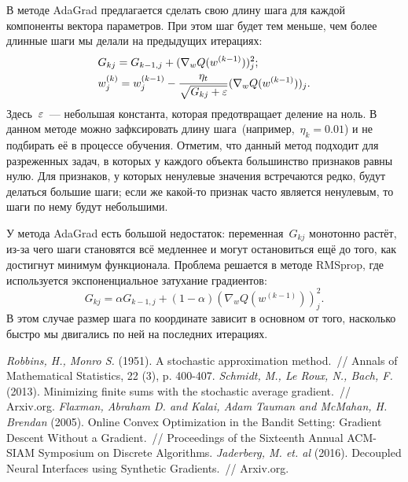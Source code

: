\documentclass[12pt,fleqn]{article}
\begin{document}
В методе AdaGrad предлагается сделать свою длину шага для каждой компоненты вектора параметров.
При этом шаг будет тем меньше, чем более длинные шаги мы делали на предыдущих итерациях:
\begin{align*}
    &G_{kj} = G_{k-1,j} + (\nabla_w Q(w^{(k-1)}))_j^2;\\
    &w_j^{(k)} = w_j^{(k-1)} - \frac{\eta_t}{\sqrt{G_{kj} + \varepsilon}} (\nabla_w Q(w^{(k-1)}))_j.
\end{align*}
Здесь~$\varepsilon$~--- небольшая константа, которая предотвращает деление на ноль.
В данном методе можно зафксировать длину шага~(например,~$\eta_k = 0.01$)
и не подбирать её в процессе обучения.
Отметим, что данный метод подходит для разреженных задач, в которых у каждого объекта большинство признаков равны нулю.
Для признаков, у которых ненулевые значения встречаются редко, будут делаться большие шаги;
если же какой-то признак часто является ненулевым, то шаги по нему будут небольшими.

У метода AdaGrad есть большой недостаток: переменная~$G_{kj}$ монотонно растёт,
из-за чего шаги становятся всё медленнее и могут остановиться ещё до того,
как достигнут минимум функционала.
Проблема решается в методе RMSprop, где используется экспоненциальное затухание градиентов:
\[
    G_{kj} = \alpha G_{k-1,j} + (1 - \alpha) (\nabla_w Q(w^{(k-1)}))_j^2.
\]
В этом случае размер шага по координате зависит в основном от того, насколько
быстро мы двигались по ней на последних итерациях.

\begin{thebibliography}{1}
    \emph{Robbins, H., Monro S.} (1951).
    A stochastic approximation method.~//
    Annals of Mathematical Statistics,
    22 (3), p. 400-407.
    \emph{Schmidt, M., Le Roux, N., Bach, F. } (2013).
    Minimizing finite sums with the stochastic average gradient.~//
    Arxiv.org.
    \emph{Flaxman, Abraham D. and Kalai, Adam Tauman and McMahan, H. Brendan} (2005).
    Online Convex Optimization in the Bandit Setting: Gradient Descent Without a Gradient.~//
    Proceedings of the Sixteenth Annual ACM-SIAM Symposium on Discrete Algorithms.
    \emph{Jaderberg, M. et. al} (2016).
    Decoupled Neural Interfaces using Synthetic Gradients.~//
    Arxiv.org.
\end{thebibliography}
\end{document}

